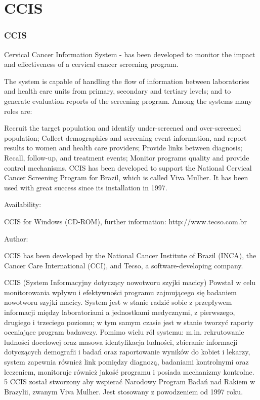 \section{CCIS}

\begin{frame}
\frametitle{CCIS}
  Cervical Cancer Information System -   
 has been developed to monitor the impact and effectiveness of a cervical cancer screening program. 

The system is capable of handling the flow of information between laboratories and health care units from primary, secondary and tertiary levels; and to generate evaluation reports of the screening program. Among the systems many roles are:

Recruit the target population and identify under-screened and over-screened population;
Collect demographics and screening event information, and report results to women and health care providers;
Provide links between diagnosis;
Recall, follow-up, and treatment events;
Monitor programs quality and provide control mechanisms.
CCIS has been developed to support the National Cervical Cancer Screening Program for Brazil, which is called Viva Mulher. It has been used with great success since its installation in 1997.


Availability: 

CCIS for Windows (CD-ROM), further information: http://www.tecso.com.br


Author: 

CCIS has been developed by the National Cancer Institute of Brazil (INCA), the Cancer Care International (CCI), and Tecso, a software-developing company.


CCIS (System Informacyjny dotyczący nowotworu szyjki macicy)
Powstał w celu monitorowania wpływu i efektywności programu zajmującego
się badaniem nowotworu szyjki macicy. System jest w stanie radzić sobie z
przepływem informacji między laboratoriami a jednostkami medycznymi, z
pierwszego, drugiego i trzeciego poziomu; w tym samym czasie jest w stanie tworzyć
raporty oceniające program badawczy. Pomimo wielu ról systemu: m.in.
rekrutowanie ludności docelowej oraz masowa identyfikacja ludności, zbieranie
informacji dotyczących demografii i badań oraz raportowanie wyników do kobiet i
lekarzy, system zapewnia również link pomiędzy diagnozą, badaniami kontrolnymi
oraz leczeniem, monitoruje również jakość programu i posiada
mechanizmy
kontrolne.
5
CCIS został stworzony aby wspierać Narodowy Program Badań nad Rakiem w
Brazylii, zwanym Viva Mulher. Jest stosowany z powodzeniem od 1997 roku.


\end{frame}
